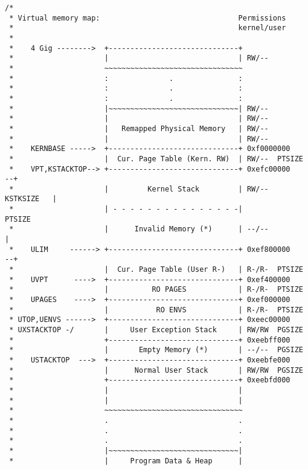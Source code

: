 \documentclass{article}
\begin{document}
\begin{CJK*}{UTF8}{gkai}
\begin{lstlisting}[style=ccode, title={\scriptsize \ttfamily \bfseries inc/memlayout.h}]
/*
 * Virtual memory map:                                Permissions
 *                                                    kernel/user
 *
 *    4 Gig -------->  +------------------------------+
 *                     |                              | RW/--
 *                     ~~~~~~~~~~~~~~~~~~~~~~~~~~~~~~~~
 *                     :              .               :
 *                     :              .               :
 *                     :              .               :
 *                     |~~~~~~~~~~~~~~~~~~~~~~~~~~~~~~| RW/--
 *                     |                              | RW/--
 *                     |   Remapped Physical Memory   | RW/--
 *                     |                              | RW/--
 *    KERNBASE ----->  +------------------------------+ 0xf0000000
 *                     |  Cur. Page Table (Kern. RW)  | RW/--  PTSIZE
 *    VPT,KSTACKTOP--> +------------------------------+ 0xefc00000      --+
 *                     |         Kernel Stack         | RW/--  KSTKSIZE   |
 *                     | - - - - - - - - - - - - - - -|                 PTSIZE
 *                     |      Invalid Memory (*)      | --/--             |
 *    ULIM     ------> +------------------------------+ 0xef800000      --+
 *                     |  Cur. Page Table (User R-)   | R-/R-  PTSIZE
 *    UVPT      ---->  +------------------------------+ 0xef400000
 *                     |          RO PAGES            | R-/R-  PTSIZE
 *    UPAGES    ---->  +------------------------------+ 0xef000000
 *                     |           RO ENVS            | R-/R-  PTSIZE
 * UTOP,UENVS ------>  +------------------------------+ 0xeec00000
 * UXSTACKTOP -/       |     User Exception Stack     | RW/RW  PGSIZE
 *                     +------------------------------+ 0xeebff000
 *                     |       Empty Memory (*)       | --/--  PGSIZE
 *    USTACKTOP  --->  +------------------------------+ 0xeebfe000
 *                     |      Normal User Stack       | RW/RW  PGSIZE
 *                     +------------------------------+ 0xeebfd000
 *                     |                              |
 *                     |                              |
 *                     ~~~~~~~~~~~~~~~~~~~~~~~~~~~~~~~~
 *                     .                              .
 *                     .                              .
 *                     .                              .
 *                     |~~~~~~~~~~~~~~~~~~~~~~~~~~~~~~|
 *                     |     Program Data & Heap      |

\end{lstlisting}
\end{CJK*}
\end{document}
